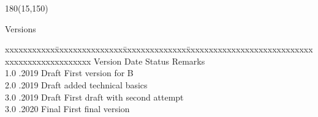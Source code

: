 
\begin{textblock}{180}(15,150)
\color{black}
\begin{huge}
Versions
\end{huge}
\vspace{10mm}

\fontsize{10pt}{18pt}\selectfont
\begin{tabbing}
xxxxxxxxxxx\=xxxxxxxxxxxxxxx\=xxxxxxxxxxxxxx\=xxxxxxxxxxxxxxxxxxxxxxxxxxxxxxxxxxxxxxxxxxxxxxx \kill
Version	\> Date	\> Status			\> Remarks		\\
1.0	.2019	\> Draft		\> First version for B	\\	
2.0	.2019	\> Draft		\> added technical basics	\\	
3.0	.2019	\> Draft		\> First draft with second attempt	\\	
3.0	.2020	\> Final		\> First final version	\\	

\end{tabbing}

\end{textblock}
